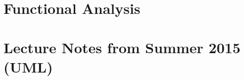 \documentclass[crop=false,class=article,oneside]{standalone}
\begin{document}
    \ifx\ifmathcoursesfunctional\undefined
        \section*{Functional Analysis}
        \setcounter{section}{1}
        \renewcommand\thefigure{\arabic{section}.\arabic{figure}}
        \renewcommand\thesubfigure{%
            \arabic{section}.\arabic{figure}.\arabic{subfigure}}
    \else
        \section{Lecture Notes from Summer 2015 (UML)}
    \fi
    
\end{document}
